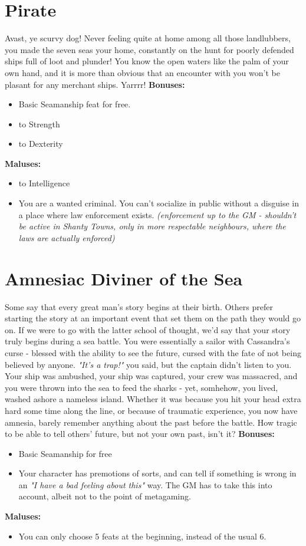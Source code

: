 \documentclass[openany,10pt,a4paper]{book}
\begin{document}
\section{Pirate}
Avast, ye scurvy dog! Never feeling quite at home among all those landlubbers, you made the seven seas your home, constantly on the hunt for poorly defended ships full of loot and plunder! You know the open waters like the palm of your own hand, and it is more than obvious that an encounter with you won't be plasant for any merchant ships. Yarrrr!\newline
\textbf{Bonuses:}
\begin{itemize}
	\item Basic Seamanship feat for free.
	\item {} to Strength
	\item {} to Dexterity
\end{itemize}
\textbf{Maluses:}
\begin{itemize}
	\item {} to Intelligence
	\item You are a wanted criminal. You can't socialize in public without a disguise in a place where law enforcement exists. \textit{(enforcement up to the GM - shouldn't be active in Shanty Towns, only in more respectable neighbours, where the laws are actually enforced)}
\end{itemize}
\section{Amnesiac Diviner of the Sea}
Some say that every great man's story begins at their birth. Others prefer starting the story at an important event that set them on the path they would go on. If we were to go with the latter school of thought, we'd say that your story truly begins during a sea battle. You were essentially a sailor with Cassandra's curse - blessed with the ability to see the future, cursed with the fate of not being believed by anyone. \textit{"It's a trap!"} you said, but the captain didn't listen to you. Your ship was ambushed, your ship was captured, your crew was massacred, and you were thrown into the sea to feed the sharks - yet, somhehow, you lived, washed ashore a nameless island. Whether it was because you hit your head extra hard some time along the line, or because of traumatic experience, you now have amnesia, barely remember anything about the past before the battle. How tragic to be able to tell others' future, but not your own past, isn't it?\newline
\textbf{Bonuses:}
\begin{itemize}
	\item Basic Seamanship for free
	\item Your character has premotions of sorts, and can tell if something is wrong in an \textit{"I have a bad feeling about this"} way. The GM has to take this into account, albeit not to the point of metagaming.
\end{itemize}
\textbf{Maluses:}
\begin{itemize}
	\item You can only choose 5 feats at the beginning, instead of the usual 6.
\end{itemize}
\end{document}
